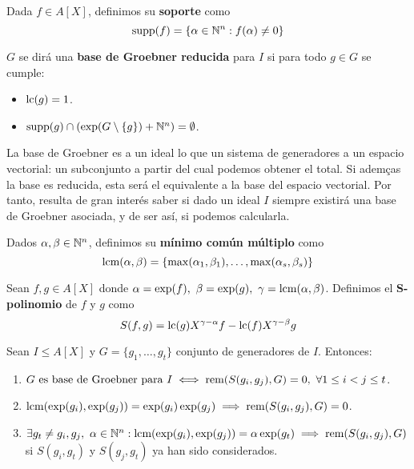 \begin{definicion}
  Dada $f\in A[X]$, definimos su \textbf{soporte} como $$\text{supp}(f) = \{ \alpha\in\mathbb{N}^n : f(\alpha) \neq 0\}$$
\end{definicion}

\begin{definicion}
  $G$ se dirá una \textbf{base de Groebner reducida} para $I$ si para todo $g\in G$ se cumple:
  \begin{itemize}
    \item $\text{lc}(g)=1$.
    \item $\text{supp}(g) \cap \left(\exp(G\setminus\{g\}) + \mathbb{N}^n \right) = \emptyset$.
  \end{itemize}
\end{definicion}

La base de Groebner es a un ideal lo que un sistema de generadores a un espacio vectorial: un subconjunto a partir del cual podemos obtener el total. Si ademças la base es reducida, esta será el equivalente a la base del espacio vectorial. Por tanto, resulta de gran interés saber si dado un ideal $I$ siempre existirá una base de Groebner asociada, y de ser así, si podemos calcularla.

\begin{definicion}
  Dados $\alpha,\beta \in \mathbb{N}^n$, definimos su \textbf{mínimo común múltiplo} como
  \begin{equation*}
    \text{lcm}(\alpha,\beta) = \{\max(\alpha_1, \beta_1),\dots, \max(\alpha_s, \beta_s)\}
  \end{equation*}
\end{definicion}

\begin{definicion}
  Sean $f,g \in A[X]$ donde $\alpha=\exp(f),\ \beta=\exp(g),\ \gamma = \text{lcm}(\alpha,\beta)$. Definimos el \textbf{S-polinomio} de $f$ y $g$ como
  \begin{equation*}
    S(f,g) = \text{lc}(g)X^{\gamma-\alpha}f - \text{lc}(f)X^{\gamma-\beta}g
  \end{equation*}
\end{definicion}

\begin{teorema}
  Sean $I\le A[X]$ y $G=\{g_1,\dots, g_t\}$ conjunto de generadores de $I$. Entonces:
  \begin{enumerate}
    \item $G \text{ es base de Groebner para } I \iff \text{rem}(S(g_i,g_j), G)=0,\ \forall 1\le i<j\le t$.
    \item $\text{lcm}(\exp(g_i),\exp(g_j)) = \exp(g_i)\exp(g_j) \implies \text{rem}(S(g_i,g_j), G) = 0$.
    \item $\exists g_t\neq g_i,g_j,\ \alpha\in \mathbb{N}^n : \text{lcm}(\exp(g_i), \exp(g_j)) = \alpha \exp(g_t) \implies \text{rem}(S(g_i,g_j), G)$ si $S(g_i,g_t)$ y $S(g_j,g_t)$ ya han sido considerados.
  \end{enumerate}
\end{teorema}

